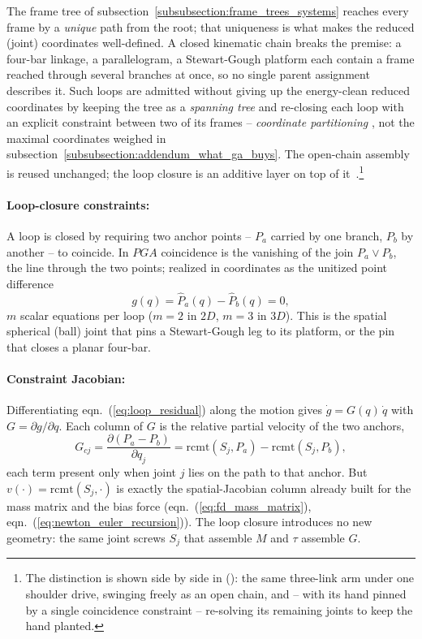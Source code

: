 The frame tree of subsection~\ref{subsubsection:frame_trees_systems} reaches every frame
by a \emph{unique} path from the root; that uniqueness is what makes the reduced (joint)
coordinates well-defined. A closed kinematic chain breaks the premise: a four-bar linkage,
a parallelogram, a Stewart-Gough platform each contain a frame reached through several
branches at once, so no single parent assignment describes it. Such loops are admitted
without giving up the energy-clean reduced coordinates by keeping the tree as a
\emph{spanning tree} and re-closing each loop with an explicit constraint between two of
its frames -- \emph{coordinate partitioning}
\cite{Wehage_Haug_coordinate_partitioning:1982}, not the maximal coordinates weighed in
subsection~\ref{subsubsection:addendum_what_ga_buys}. The open-chain assembly is reused
unchanged; the loop closure is an additive layer on top of
it~\cite{Featherstone_rigid_body_dynamics:2008}.\footnote{The distinction is shown side by
side in  (): the same three-link arm
under one shoulder drive, swinging freely as an open chain, and -- with its hand pinned by
a single coincidence constraint -- re-solving its remaining joints to keep the hand
planted.}

\paragraph{Loop-closure constraints:} A loop is closed by requiring two anchor points --
$P_a$ carried by one branch, $P_b$ by another -- to coincide. In $PGA$ coincidence is the
vanishing of the join $P_a \vee P_b$, the line through the two points; realized in
coordinates as the unitized point difference
\begin{equation}
    g(q) = \hat{P}_a(q) - \hat{P}_b(q) = 0,
    \label{eq:loop_residual}
\end{equation}
$m$ scalar equations per loop ($m = 2$ in $2D$, $m = 3$ in $3D$). This is the spatial
spherical (ball) joint that pins a Stewart-Gough leg to its platform, or the pin that
closes a planar four-bar.

\paragraph{Constraint Jacobian:} Differentiating eqn.~(\ref{eq:loop_residual}) along the
motion gives $\dot{g} = G(q)\,\dot{q}$ with $G = \partial g / \partial q$. Each column of
$G$ is the relative partial velocity of the two anchors,
\begin{equation}
    G_{cj} = \frac{\partial (P_a - P_b)}{\partial q_j}
           = \mathrm{rcmt}(S_j, P_a) - \mathrm{rcmt}(S_j, P_b),
    \label{eq:loop_jacobian}
\end{equation}
each term present only when joint $j$ lies on the path to that anchor. But $v(\cdot) =
\mathrm{rcmt}(S_j,\cdot)$ is exactly the spatial-Jacobian column already built for the
mass matrix and the bias force (eqn.~(\ref{eq:fd_mass_matrix}),
eqn.~(\ref{eq:newton_euler_recursion})). The loop closure introduces no new geometry: the
same joint screws $S_j$ that assemble $M$ and $\tau$ assemble $G$.

